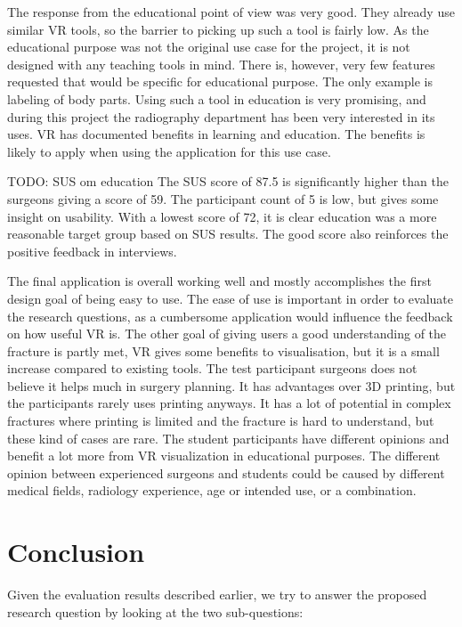 \documentclass[a4paper]{report}
\begin{document}
The response from the educational point of view was very good. They already use similar VR tools, so the barrier to picking up such a tool is fairly low.
As the educational purpose was not the original use case for the project, it is not designed with any teaching tools in mind. There is, however, very few features requested that would be specific for educational purpose. The only example is labeling of body parts. 
Using such a tool in education is very promising, and during this project the radiography department has been very interested in its uses.
VR has documented benefits in learning and education. The benefits is likely to apply when using the application for this use case.

TODO: SUS om education
The SUS score of 87.5 is significantly higher than the surgeons giving a score of 59.
The participant count of 5 is low, but gives some insight on usability. With a lowest score of 72, it is clear education was a more reasonable target group based on SUS results. The good score also reinforces the positive feedback in interviews.

The final application is overall working well and mostly accomplishes the first design goal of being easy to use. The ease of use is important in order to evaluate the research questions, as a cumbersome application would influence the feedback on how useful VR is.
The other goal of giving users a good understanding of the fracture is partly met, VR gives some benefits to visualisation, but it is a small increase compared to existing tools.
The test participant surgeons does not believe it helps much in surgery planning. It has advantages over 3D printing, but the participants rarely uses printing anyways. It has a lot of potential in complex fractures where printing is limited and the fracture is hard to understand, but these kind of cases are rare.
The student participants have different opinions and benefit a lot more from VR visualization in educational purposes. The different opinion between experienced surgeons and students could be caused by different medical fields, radiology experience, age or intended use, or a combination.





\chapter{Conclusion}
Given the evaluation results described earlier, we try to answer the proposed research question by looking at the two sub-questions:
\end{document}

